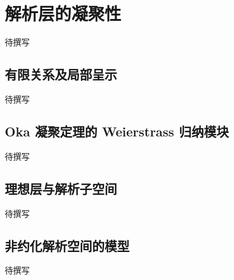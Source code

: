 
% 
% 

\section{解析层的凝聚性}
\label{g4:sec:1404}

待撰写

\subsection{有限关系及局部呈示}
\label{g4:subsec:1404:01}
待撰写

\subsection{Oka 凝聚定理的 Weierstrass 归纳模块}
\label{g4:subsec:1404:02}
待撰写

\subsection{理想层与解析子空间}
\label{g4:subsec:1404:03}
待撰写

\subsection{非约化解析空间的模型}
\label{g4:subsec:1404:04}
待撰写
